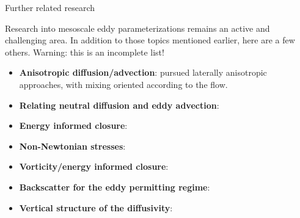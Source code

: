 \documentclass{beamer}
\begin{document}
\begin{frame}{Further related research}


Research into mesoscale eddy parameterizations remains an active and
challenging area.  In addition to those topics mentioned earlier, here
are a few others. Warning: this is an incomplete list!

\begin{itemize}

  \scriptsize
  
\item[$\star$] {\bf Anisotropic diffusion/advection}:
  \textcite{SmithGent2004,Foxkemper_etal2013,bachman2020diagnosis}
  pursued laterally anisotropic approaches, with mixing oriented
  according to the flow.

\item[$\star$] {\bf Relating neutral diffusion and eddy advection}:
  \textcite{SmithMarshall2009,Abernathey2013}

\item[$\star$] {\bf Energy informed closure}:
  \textcite{EdenGreat2008,MarshallAdcroft2010,Grooms_etal2025}

\item[$\star$] {\bf Non-Newtonian stresses}:
  \textcite{AnsteyZanna2017,Bachman_etal2018}

\item[$\star$] {\bf Vorticity/energy informed closure}:
  \textcite{Marshall_etal2012,Maddison_Marshall2013,Mak_etal2017}

\item[$\star$] {\bf Backscatter for the eddy permitting regime}:
  \textcite{Jansen_Held_2014,Jansen_etal2015,Juricke_etal2020,Pudig_etal2026}

\item[$\star$] {\bf Vertical structure of the diffusivity}:
  \textcite{zhang2024role,Yankovsky_etal2024}
  

\end{itemize}  

\end{frame}
\end{document}
